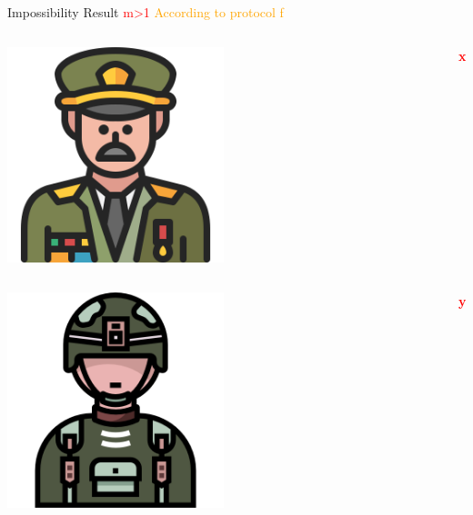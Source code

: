 \documentclass{beamer}
\begin{document}
\begin{frame}{Impossibility Result  \textcolor{red}{m>1}}
\textcolor{orange}{According to protocol f}

\begin{columns}[c] %
    \begin{column}{0.3\textwidth} %
        \includegraphics[width=0.5\textwidth]{images2/commander.png} %
    \end{column}
    \begin{column}{0.7\textwidth} %
        \textbf{\textcolor{red}{x}}
    \end{column}
\end{columns}

\vspace{0.5cm} %


\begin{columns}[c] %
    \begin{column}{0.3\textwidth} %
        \includegraphics[width=0.5\textwidth]{images2/soldier (1).png} %
    \end{column}
    \begin{column}{0.7\textwidth} %
        \textbf{\textcolor{red}{y}}
    \end{column}
\end{columns}


\end{frame}
\end{document}
